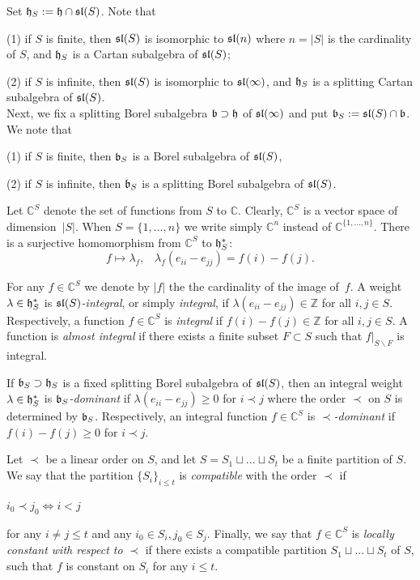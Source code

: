 \documentclass[10pt]{amsart}\oddsidemargin -1mm \evensidemargin -1mm \topmargin -15mm\headheight5mm \headsep 3.5mm \textheight 245mm\textwidth 170mm %
\theoremstyle{definition}\newtheorem{theorem}{Theorem}[section]\newtheorem{lemma}[theorem]{Lemma}\newtheorem{remark}[theorem]{Remark}\newtheorem{proposition}[theorem]{Proposition}\newtheorem{corollary}[theorem]{Corollary}\newtheorem{definition}[theorem]{Definition}\newtheorem{Ex}[theorem]{Example}
\begin{document}
Set $\frak h_S:=\frak h\cap\frak{sl}(S)$. Note that

(1) if $S$ is finite, then $\frak{sl}(S)$ is isomorphic to $\frak{sl}(n)$ where $n=|S|$ is the cardinality of $S$, and $\frak h_S$ is a Cartan subalgebra of $\frak{sl}(S)$;

(2) if $S$ is infinite, then $\frak{sl}(S)$ is isomorphic to $\frak{sl}(\infty)$, and $\frak h_S$  is a splitting Cartan subalgebra of $\frak{sl}(S)$.\\
Next, we fix a splitting Borel subalgebra $\frak b\supset\frak h$ of $\frak{sl}(\infty)$ and put $\frak b_S:=\frak{sl}(S)\cap\frak b$. We note that

(1) if $S$ is finite, then $\frak b_S$ is a Borel subalgebra of $\frak{sl}(S)$,

(2) if $S$ is infinite, then $\frak b_S$ is a splitting Borel subalgebra of $\frak{sl}(S)$.

Let $\mathbb C^S$ denote the set of functions from $S$ to $\mathbb C$. Clearly, $\mathbb C^S$ is a vector space of
dimension~$|S|$. When $S=\{1,..., n\}$ we write simply $\mathbb C^n$ instead of $\mathbb C^{\{1,..., n\}}$. There is a surjective
homomorphism from $\mathbb C^S$ to $\frak h_S^*$:\begin{equation}f\mapsto \lambda_f,\hspace{10pt}
\lambda_f(e_{ii}-e_{jj})=f(i)-f(j).\end{equation}%

For any $f\in \mathbb C^S$ we denote by $|f|$ the the cardinality of the image of~$f$. A weight $\lambda\in\frak h^*_S$ is {\it $\frak{sl}(S)$-integral}, or simply {\it integral}, if $\lambda(e_{ii}-e_{jj})\in\mathbb Z$ for all $i, j\in S$. Respectively, a function $f\in\mathbb C^S$ is {\it integral} if $f(i)-f(j)\in\mathbb Z$ for all $i, j\in S$. A function is {\it almost integral} if there exists a finite subset $F\subset S$ such that $f|_{S\backslash F}$ is integral.

If $\frak b_S\supset\frak h_S$ is a fixed splitting Borel subalgebra of $\frak{sl}(S)$, then an integral weight $\lambda\in\frak h_S^*$ is {\it $\frak b_S$-dominant} if $\lambda(e_{ii}-e_{jj})\ge0$ for $i\prec j$ where the order $\prec$ on $S$ is determined by $\frak b_S$. Respectively, an integral function $f\in \mathbb C^S$ is {\it $\prec$-dominant} if $f(i)-f(j)\ge0$ for $i\prec j$.

Let $\prec$ be a linear order on $S$, and let $S=S_1\sqcup ...\sqcup S_t$ be a finite partition of $S$. We say that the partition $\{S_i\}_{i\le t}$ is {\it compatible} with the order $\prec$ if\begin{center}$i_0\prec j_0\Leftrightarrow i<j$\end{center}for any
$i\ne j\le t$ and any $i_0 \in S_i, j_0\in S_j$. Finally, we say that $f\in \mathbb C^S$ is {\it locally constant with respect to} $\prec$ if there exists
a compatible partition $S_1\sqcup...\sqcup S_t$ of $S$, such
that $f$ is constant on $S_i$ for any $i\le t$.
\end{document}
